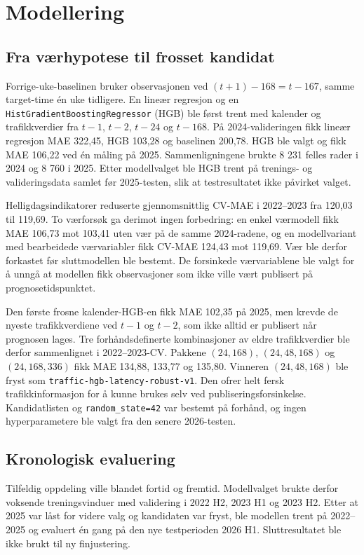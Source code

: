 \section{Modellering}

\subsection{Fra værhypotese til frosset kandidat}

Forrige-uke-baselinen bruker observasjonen ved $(t+1)-168=t-167$, samme target-time
én uke tidligere. En lineær regresjon og en \texttt{HistGradientBoostingRegressor}
(HGB) ble først trent med kalender og trafikkverdier fra $t-1$, $t-2$, $t-24$ og
$t-168$. På 2024-valideringen fikk lineær regresjon MAE 322,45, HGB 103,28 og
baselinen 200,78. HGB ble valgt og fikk MAE 106,22 ved én måling på 2025.
Sammenligningene brukte 8 231 felles rader i 2024 og 8 760 i 2025. Etter
modellvalget ble HGB trent på trenings- og valideringsdata samlet før 2025-testen,
slik at testresultatet ikke påvirket valget.

Helligdagsindikatorer reduserte gjennomsnittlig CV-MAE i 2022--2023 fra 120,03 til
119,69. To værforsøk ga derimot ingen forbedring: en enkel værmodell fikk MAE 106,73
mot 103,41 uten vær på de samme 2024-radene, og en modellvariant med bearbeidede værvariabler fikk CV-MAE
124,43 mot 119,69. Vær ble derfor forkastet før sluttmodellen ble bestemt.
De forsinkede værvariablene ble valgt for å unngå at modellen fikk observasjoner som
ikke ville vært publisert på prognosetidspunktet.

Den første frosne kalender-HGB-en fikk MAE 102,35 på 2025, men krevde de nyeste
trafikkverdiene ved $t-1$ og $t-2$, som ikke alltid er publisert når prognosen
lages. Tre forhåndsdefinerte kombinasjoner av eldre trafikkverdier ble derfor sammenlignet i
2022--2023-CV. Pakkene $(24,168)$, $(24,48,168)$ og $(24,168,336)$ fikk MAE 134,88,
133,77 og 135,80. Vinneren $(24,48,168)$ ble fryst som
\texttt{traffic-hgb-latency-robust-v1}. Den ofrer helt fersk trafikkinformasjon for
å kunne brukes selv ved publiseringsforsinkelse. Kandidatlisten og
\texttt{random\_state=42} var bestemt på forhånd, og ingen hyperparametere ble valgt
fra den senere 2026-testen.

\subsection{Kronologisk evaluering}

Tilfeldig oppdeling ville blandet fortid og fremtid. Modellvalget brukte derfor
voksende treningsvinduer med validering i 2022 H2, 2023 H1 og 2023 H2. Etter at
2025 var låst for videre valg og kandidaten var fryst, ble modellen trent på
2022--2025 og evaluert én gang på den nye testperioden 2026 H1. Sluttresultatet ble
ikke brukt til ny finjustering.

